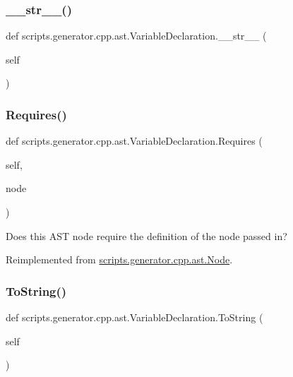 \subsubsection{\texorpdfstring{\_\_str\_\_()}{\_\_str\_\_()}}
{\footnotesize\ttfamily def scripts.\+generator.\+cpp.\+ast.\+Variable\+Declaration.\+\_\+\+\_\+str\+\_\+\+\_\+ (\begin{DoxyParamCaption}\item[{}]{self }\end{DoxyParamCaption})}

\mbox{\label{classscripts_1_1generator_1_1cpp_1_1ast_1_1_variable_declaration_ab09d4cce8b643aef4b7ac1e4499c1cc2}} 
\subsubsection{\texorpdfstring{Requires()}{Requires()}}
{\footnotesize\ttfamily def scripts.\+generator.\+cpp.\+ast.\+Variable\+Declaration.\+Requires (\begin{DoxyParamCaption}\item[{}]{self,  }\item[{}]{node }\end{DoxyParamCaption})}

\begin{DoxyVerb}Does this AST node require the definition of the node passed in?\end{DoxyVerb}
 

Reimplemented from \mbox{\hyperlink{classscripts_1_1generator_1_1cpp_1_1ast_1_1_node_a37c4215d199947155270a485a3add21e}{scripts.\+generator.\+cpp.\+ast.\+Node}}.

\mbox{\label{classscripts_1_1generator_1_1cpp_1_1ast_1_1_variable_declaration_adedf3c3740f8f3d8e018516b1249e22a}} 
\subsubsection{\texorpdfstring{ToString()}{ToString()}}
{\footnotesize\ttfamily def scripts.\+generator.\+cpp.\+ast.\+Variable\+Declaration.\+To\+String (\begin{DoxyParamCaption}\item[{}]{self }\end{DoxyParamCaption})}

